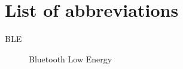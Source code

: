 \documentclass[thesis.tex]{subfiles}
\begin{document}
\chapter*{List of abbreviations}
\begin{description}
\item[BLE] Bluetooth Low Energy
\end{description}

\blankpage
\end{document}
